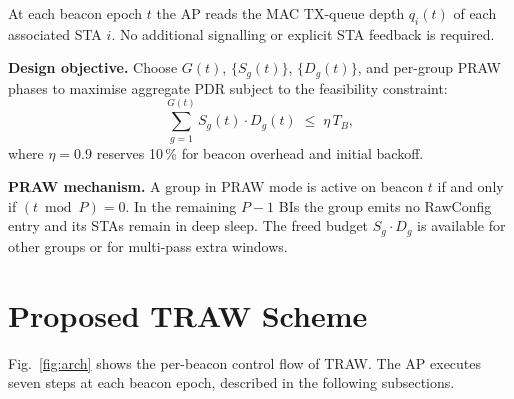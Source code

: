\documentclass[conference]{IEEEtran}
\begin{document}
At each beacon epoch $t$ the AP reads the MAC TX-queue depth
$q_i(t)$ of each associated STA $i$.
No additional signalling or explicit STA feedback is required.

\textbf{Design objective.}
Choose $G(t)$, $\{S_g(t)\}$, $\{D_g(t)\}$, and per-group PRAW
phases to maximise aggregate PDR subject to the feasibility constraint:
\begin{equation}
  \sum_{g=1}^{G(t)} S_g(t)\cdot D_g(t) \;\leq\; \eta\,T_B,
  \label{eq:feasibility}
\end{equation}
where $\eta\!=\!0.9$ reserves 10\,\% for beacon overhead and initial
backoff.

\textbf{PRAW mechanism.}
A group in PRAW mode is active on beacon $t$ if and only if
$(t \bmod P)\!=\!0$.
In the remaining $P-1$ BIs the group emits no RawConfig entry and
its STAs remain in deep sleep.
The freed budget $S_g\cdot D_g$ is available for other groups or
for multi-pass extra windows.

\section{Proposed TRAW Scheme}
\label{sec:design}

Fig.~\ref{fig:arch} shows the per-beacon control flow of TRAW.
The AP executes seven steps at each beacon epoch, described in the
following subsections.
\end{document}
